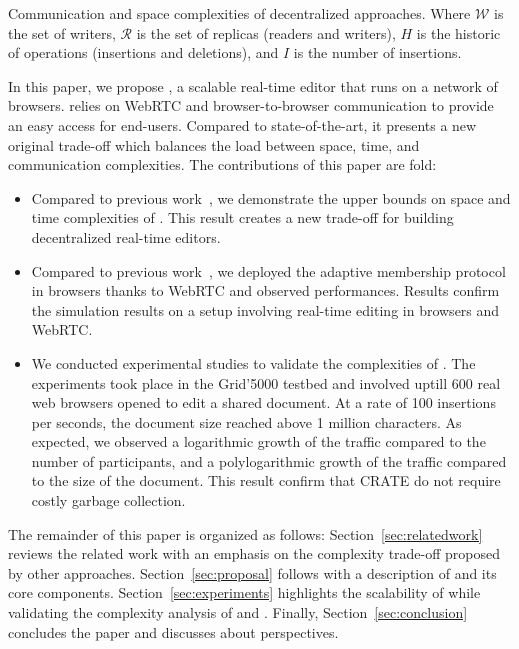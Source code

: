 \begin{table*}[t]
  \centering
  
  \caption{\label{table:complexities}
    Communication and space complexities of decentralized approaches.
    Where $\mathcal{W}$ is the set of writers, 
    $\mathcal{R}$ is the set of replicas (readers and writers),
    $H$ is the historic of operations (insertions and deletions),
    and $I$ is the number of insertions.}
\end{table*}


In this paper, we propose \CRATE, a scalable real-time editor that runs on a
network of browsers. \CRATE relies on WebRTC and browser-to-browser
communication to provide an easy access for end-users. Compared to
state-of-the-art, it presents a new original trade-off which balances the load
between space, time, and communication complexities. The contributions of this
paper are fold:
\begin{itemize}
\item Compared to previous work~\cite{nedelec2013lseq}, we demonstrate the upper
  bounds on space and time complexities of \LSEQ. This result creates
  a new trade-off for building decentralized real-time editors.
\item Compared to previous work~\cite{nedelec2015spray}, we deployed
  the \SPRAY adaptive membership protocol in browsers thanks to WebRTC
  and observed performances. Results confirm the simulation results on a
  setup involving real-time editing in browsers and WebRTC.
\item We conducted experimental studies to validate the complexities of
  \CRATE. The experiments took place in the Grid'5000 testbed and involved
  uptill $600$ real web browsers opened to edit a shared document. At a rate of
  100 insertions per seconds, the document size reached above 1 million
  characters. As expected, we observed a logarithmic growth of the traffic
  compared to the number of participants, and a polylogarithmic growth of the
  traffic compared to the size of the document. This result confirm
  that CRATE do not require costly garbage collection. 
\end{itemize}

The remainder of this paper is organized as follows:
Section~\ref{sec:relatedwork} reviews the related work with an emphasis on the
complexity trade-off proposed by other approaches. Section~\ref{sec:proposal}
follows with a description of \CRATE and its core
components. Section~\ref{sec:experiments} highlights the scalability of \CRATE
while validating the complexity analysis of \LSEQ and \SPRAY. Finally,
Section~\ref{sec:conclusion} concludes the paper and discusses about
perspectives.


